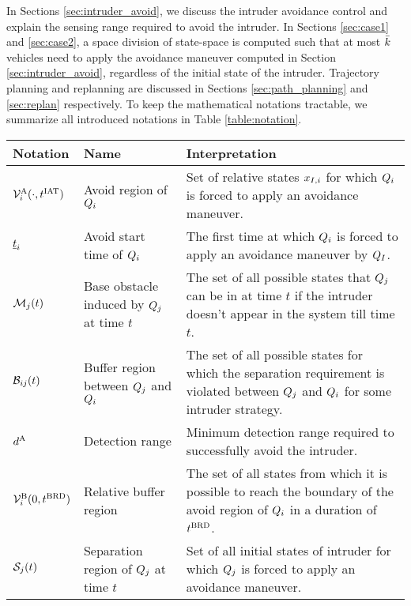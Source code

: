 In Sections \ref{sec:intruder_avoid}, we discuss the intruder avoidance control and explain the sensing range required to avoid the intruder. In Sections \ref{sec:case1} and \ref{sec:case2}, a space division of state-space is computed such that at most $\bar{k}$ vehicles need to apply the avoidance maneuver computed in Section \ref{sec:intruder_avoid}, regardless of the initial state of the intruder. %
Trajectory planning and replanning are discussed in Sections \ref{sec:path_planning} and \ref{sec:replan} respectively. To keep the mathematical notations tractable, we summarize all introduced notations in Table \ref{table:notation}.

\begin{table*}
    \begin{tabular}{ | l | l | p{11cm} |}
    \hline
    \textbf{Notation} & \textbf{Name} & \textbf{Interpretation} \\ \hline
    
    $\mathcal{V}^{\text{A}}_{i}(\cdot, t^\text{IAT})$ & Avoid region of $Q_i$ & Set of relative states $x_{I, i}$ for which $Q_i$ is forced to apply an avoidance maneuver. \\ \hline
    
    $\underline{t}_i$ & Avoid start time of $Q_i$ & The first time at which $Q_i$ is forced to apply an avoidance maneuver by $Q_{I}$. \\ \hline
    
    $\mathcal{M}_j(t)$ & Base obstacle induced by $Q_j$ at time $t$ & The set of all possible states that $Q_j$ can be in at time $t$ if the intruder doesn't appear in the system till time $t$. \\ \hline
    
    $\mathcal{B}_{ij}(t)$ & Buffer region between $Q_j$ and $Q_i$ & The set of all possible states for which the separation requirement is violated between $Q_j$ and $Q_i$ for some intruder strategy. \\ \hline
     
    $d^\text{A}$ & Detection range & Minimum detection range required to successfully avoid the intruder. \\ \hline
    
    $\mathcal{V}^{\text{B}}_{i}(0, t^\text{BRD})$ & Relative buffer region & The set of all states from which it is possible to reach the boundary of the avoid region of $Q_i$ in a duration of $t^\text{BRD}$. \\ \hline 
    
    $\mathcal{S}_j(t)$ & Separation region of $Q_j$ at time $t$ & Set of all initial states of intruder for which $Q_j$ is forced to apply an avoidance maneuver. \\ \hline
    
    \end{tabular}
    \caption{Different mathematical notations and their interpretation.}
    \label{table:notation}
\end{table*}
